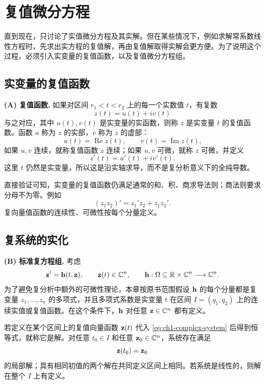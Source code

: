 \section{复值微分方程}

直到现在，只讨论了实值微分方程及其实解。但在某些情况下，例如求解常系数线性方程时，先求出实方程的复值解，再由复值解取得实解会更方便。为了说明这个过程，必须引入实变量的复值函数，以及复值微分方程组。

\subsection{实变量的复值函数}

\textbf{(A) 复值函数.} 如果对区间 \(r_1<t<r_2\) 上的每一个实数值 \(t\)，有复数
\begin{equation}
 z(t)=u(t)+iv(t)
 \label{eq:ch1-complex-function}
\end{equation}
与之对应，其中 \(u(t),v(t)\) 是实变量的实函数，则称 \(z\) 是实变量 \(t\) 的复值函数。函数 \(u\) 称为 \(z\) 的实部，\(v\) 称为 \(z\) 的虚部：
\[
 u(t)=\operatorname{Re}z(t),
 \qquad
 v(t)=\operatorname{Im}z(t).
\]
如果 \(u,v\) 连续，就称复值函数 \(z\) 连续；如果 \(u,v\) 可微，就称 \(z\) 可微，并定义
\begin{equation}
 z'(t)=u'(t)+iv'(t).
 \label{eq:ch1-complex-derivative}
\end{equation}
这里 \(t\) 仍然是实变量，所以这是沿实轴求导，而不是复分析意义下的全纯导数。

直接验证可知，实变量的复值函数仍满足通常的和、积、商求导法则；商法则要求分母不为零。例如
\[
 (z_1z_2)'
 =z_1'z_2+z_1z_2'.
\]
复向量值函数的连续性、可微性按每个分量定义。

\subsection{复系统的实化}

\textbf{(B) 标准复方程组.} 考虑
\begin{equation}
 \vect{z}'=\vect{h}(t,\vect{z}),
 \qquad
 \vect{z}(t)\in\C^n,
 \qquad
 \vect{h}:\Omega\subseteq\R\times\C^n\longrightarrow\C^n.
 \label{eq:ch1-complex-system}
\end{equation}
为了避免复分析中额外的可微性理论，本章按原书范围假设 \(\vect{h}\) 的每个分量都是复变量 \(z_1,\ldots,z_n\) 的多项式，并且多项式系数是实变量 \(t\) 在区间 \(I=(q_1,q_2)\) 上的连续实值或复值函数。在这个条件下，\(\vect{h}\) 对任意 \(\vect{z}\in\C^n\) 都有定义。

若定义在某个区间上的复值向量函数 \(\vect{z}(t)\) 代入 \eqref{eq:ch1-complex-system} 后得到恒等式，就称它是解。对任意 \(t_0\in I\) 和任意 \(\vect{z}_0\in\C^n\)，系统存在满足
\begin{equation}
 \vect{z}(t_0)=\vect{z}_0
 \label{eq:ch1-complex-initial}
\end{equation}
的局部解；具有相同初值的两个解在共同定义区间上相同。若系统是线性的，则解在整个 \(I\) 上有定义。

